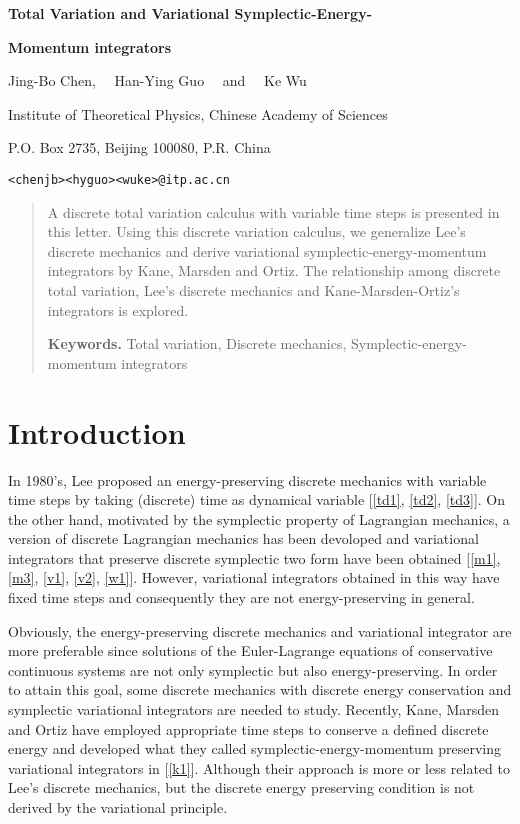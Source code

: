 \documentclass[a4paper,a4paper]{article}
\def\sect#1{\section{#1}\setcounter{equation}{0}}
\begin{document}
\centerline{} \vskip0.5cm \centerline{\LARGE \bf Total Variation
and  Variational Symplectic-Energy- } \vskip3pt \centerline{\LARGE \bf
Momentum integrators } \vskip0.7cm \centerline{\large
Jing-Bo Chen,$\quad$  Han-Ying Guo$\quad$   and$\quad$  Ke Wu}
\vskip3pt \centerline{\small Institute of Theoretical Physics,
Chinese Academy of Sciences} \vskip3pt \centerline{\small P.O. Box
2735, Beijing 100080, P.R. China} \vskip3pt \centerline{\small
\texttt{<chenjb><hyguo><wuke>@itp.ac.cn}} \vskip3pt



\begin{abstract}
A   discrete total variation calculus with variable time steps is
presented in this letter. Using this discrete variation calculus,
we generalize
Lee's discrete mechanics and derive variational
symplectic-energy-momentum integrators by Kane, Marsden and Ortiz.
The relationship among discrete total variation, Lee's discrete
mechanics and Kane-Marsden-Ortiz's integrators is explored.

\vskip8pt {\bf Keywords.} Total variation, Discrete mechanics,
Symplectic-energy-momentum integrators
\end{abstract}



\sect{Introduction}

In 1980's, Lee  proposed an energy-preserving discrete
mechanics with variable time steps by taking (discrete) time as
dynamical variable [\ref{td1}, \ref{td2}, \ref{td3}]. On the other
hand, motivated by the symplectic property of Lagrangian
mechanics, a version of discrete Lagrangian
mechanics has been devoloped and  variational integrators that preserve
discrete symplectic two form  have been obtained 
[\ref{m1}, \ref{m3}, \ref{v1}, \ref{v2}, \ref{w1}].
However,  variational integrators
obtained in this way have fixed time steps and consequently they
are not energy-preserving in general.

 Obviously,
the energy-preserving discrete mechanics and variational
integrator are more preferable since  solutions of the
Euler-Lagrange equations of conservative continuous systems are
not only symplectic but also energy-preserving. In order to attain
this goal, some discrete mechanics with discrete energy
conservation and  symplectic variational integrators are needed to
study.  Recently, Kane, Marsden and Ortiz have employed
appropriate  time steps to conserve a defined discrete energy and
developed what they called symplectic-energy-momentum preserving
variational integrators in [\ref{k1}]. Although their approach is
more or less related to Lee's discrete mechanics, but the discrete
energy preserving condition is not derived by the variational
principle.
\end{document}
